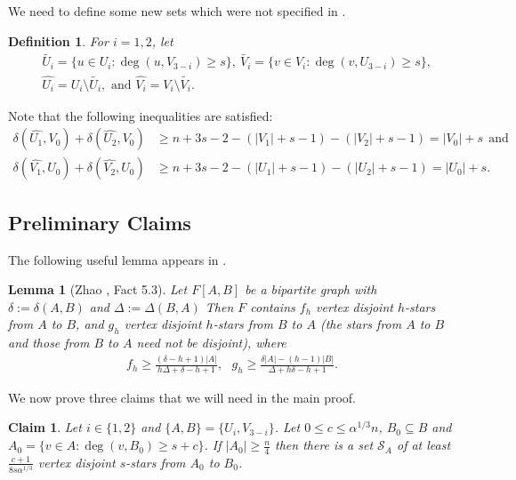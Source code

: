 \documentclass[oneside,12pt]{memoir}
\newtheorem{lemma}[theorem]{Lemma}
\newtheorem{claim}[theorem]{Claim}
\newtheorem{definition}[theorem]{Definition}
\begin{document}
We need to define some new sets which were not specified in \cite{Z}.  
\begin{definition}\label{tildehat}
For $i= 1,2$, let 
\begin{align*}
&\tilde{U_i}=\{u\in U_i:\deg(u,V_{3-i})\geq s\},~ \tilde{V_i}=\{v\in V_i:\deg(v,U_{3-i})\geq s\},\\
&\hat{U_i}=U_i\setminus \tilde{U_i}, \text{ and } \hat{V_i}=V_i\setminus \tilde{V_i}. 
\end{align*}
\end{definition}

Note that the following inequalities are satisfied:
\begin{align}
\delta(\hat{U_1},V_0)+\delta(\hat{U_2},V_0)&\geq n+3s-2-(|V_1|+s-1)-(|V_2|+s-1)=|V_0|+s ~~\text{and} \label{V_0}\\
\delta(\hat{V_1},U_0)+\delta(\hat{V_2},U_0)&\geq n+3s-2-(|U_1|+s-1)-(|U_2|+s-1)=|U_0|+s. \label{U_0}
\end{align}

\subsection{Preliminary Claims}

The following useful lemma appears in \cite{Z}.

\begin{lemma}[Zhao \cite{Z}, Fact 5.3]\label{lem:Zhao}
Let $F[A, B]$ be a bipartite graph with $\delta:=\delta(A,B)$ and $\Delta:=\Delta(B,A)$ 
Then $F$ contains $f_h$ vertex disjoint $h$-stars from $A$ to $B$, and $g_h$ vertex disjoint $h$-stars from $B$ to $A$ (the stars from $A$ to $B$ and those from $B$ to $A$ need not be disjoint), where
\begin{align*}
f_h\geq\frac{(\delta-h+1)|A|}{h\Delta+\delta-h+1}, ~~~ g_h\geq\frac{\delta|A|-(h-1)|B|}{\Delta+h\delta-h+1}.
\end{align*}

\end{lemma}

We now prove three claims that we will need in the main proof.

\begin{claim}\label{TildeStars}
Let $i\in\{1,2\}$ and $\{A,B\}=\{U_i,V_{3-i}\}$.  Let $0\leq c\leq \alpha^{1/3}n$, $B_0\subseteq B$ and $A_0=\{v\in A:\deg(v,B_0)\geq s+c\}$.
If $|A_0|\geq\frac{n}{4}$ then there is a set $\mathcal{S}_A$ of at least $\frac{c+1}{8s\alpha^{1/3}}$ vertex disjoint $s$-stars from $A_0$ to $B_0$.
\end{claim}
\end{document}
